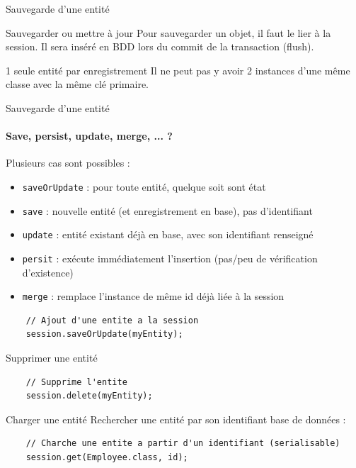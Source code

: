 \documentclass[compress]{beamer}%
\begin{document}
\begin{frame}{Sauvegarde d'une entité}
 	
 	\begin{block}{Sauvegarder ou mettre à jour}
	Pour sauvegarder un objet, il faut le lier à la session. Il sera inséré en BDD lors du commit de la transaction (flush).
	\end{block}
	
	\pause
	\begin{alertblock}{1 seule entité par enregistrement}
	Il ne peut pas y avoir 2 instances d'une même classe avec la même clé primaire.
	\end{alertblock}
	
\end{frame}

\begin{frame}[fragile]{Sauvegarde d'une entité}
 	\framesubtitle{Save, persist, update, merge, ... ?}
 	
	Plusieurs cas sont possibles :
	\begin{itemize}[<+->]
	\item \texttt{saveOrUpdate} : pour toute entité, quelque soit sont état
	\item \texttt{save} : nouvelle entité (et enregistrement en base), pas d'identifiant
	\item \texttt{update} : entité existant déjà en base, avec son identifiant renseigné 
	\item \texttt{persit} : exécute immédiatement l'insertion (pas/peu de vérification d'existence) 
	\item \texttt{merge} : remplace l'instance de même id déjà liée à la session
	\end{itemize}
	
	\begin{lstlisting}
	// Ajout d'une entite a la session
	session.saveOrUpdate(myEntity);
	\end{lstlisting}
	
\end{frame}

\begin{frame}[fragile]{Supprimer une entité}
	
	\begin{lstlisting}
	// Supprime l'entite
	session.delete(myEntity);
	\end{lstlisting}
\end{frame}


\begin{frame}[fragile]{Charger une entité}
	Rechercher une entité par son identifiant base de données :
	\begin{lstlisting}
	// Charche une entite a partir d'un identifiant (serialisable)
	session.get(Employee.class, id);
	\end{lstlisting}
\end{frame}
	
\end{document}
